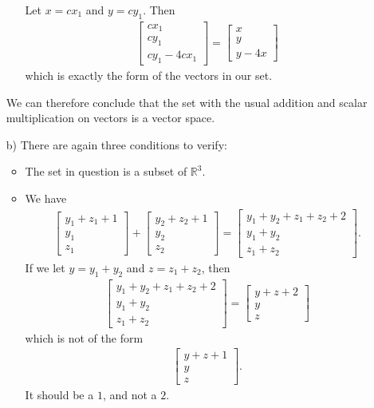 \documentclass[12pt]{article}
\begin{document}
\begin{enumerate}
\begin{itemize}
		Let $x = c x_1$ and $y = c y_1$. Then
			\begin{align*}
			\begin{bmatrix}
			c x_1 \\ c y_1 \\ cy_1 - 4c x_1
			\end{bmatrix} = \begin{bmatrix}
			x \\ y \\ y - 4x
			\end{bmatrix}
			\end{align*}
		which is exactly the form of the vectors in our set.
		\end{itemize}
	We can therefore conclude that the set with the usual addition and scalar multiplication on vectors is a vector space.
	\item[b)] There are again three conditions to verify:
		\begin{itemize}
		\item The set in question is a subset of $\mathbb{R}^3$.
		\item We have
			\begin{align*}
			\begin{bmatrix}
			y_1 + z_1 + 1 \\ y_1 \\ z_1
			\end{bmatrix} + \begin{bmatrix}
			y_2 + z_2 + 1 \\ y_2 \\ z_2
			\end{bmatrix} = 
			\begin{bmatrix}
			y_1 + y_2 + z_1 + z_2 + 2 \\ y_1 + y_2 \\ z_1 + z_2
			\end{bmatrix} .
			\end{align*}
		If we let $y = y_1 + y_2$ and $z = z_1 + z_2$, then
			\begin{align*}
			\begin{bmatrix}
			y_1 + y_2 + z_1 + z_2 + 2 \\ y_1 + y_2 \\ z_1 + z_2
			\end{bmatrix} = \begin{bmatrix}
			y + z + 2 \\ y \\ z
			\end{bmatrix}
			\end{align*}
		which is not of the form
			\begin{align*}
			\begin{bmatrix}
			y + z + 1 \\ y \\ z
			\end{bmatrix} .
			\end{align*}
		It should be a $1$, and not a $2$.
		\end{itemize}
	\end{enumerate}
	
\end{document}

